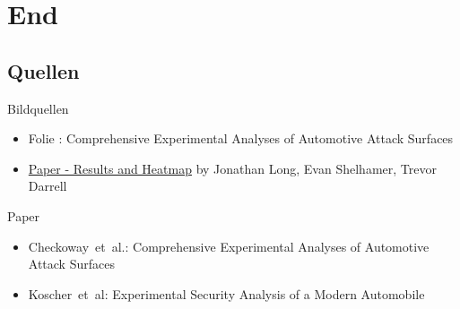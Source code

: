 \section*{End}
\subsection{Quellen}
\begin{frame}{Bildquellen}
    \begin{itemize}
        \item Folie : Comprehensive Experimental Analyses of Automotive Attack Surfaces
        \item \href{http://arxiv.org/abs/1411.4038}{Paper - Results and Heatmap} by Jonathan Long, Evan Shelhamer, Trevor Darrell
    \end{itemize}
\end{frame}

\begin{frame}{Paper}
    \begin{itemize}
        \item Checkoway~et~al.: Comprehensive Experimental Analyses of Automotive Attack Surfaces
        \item Koscher~et~al: Experimental Security Analysis of a Modern Automobile
    \end{itemize}
\end{frame}

